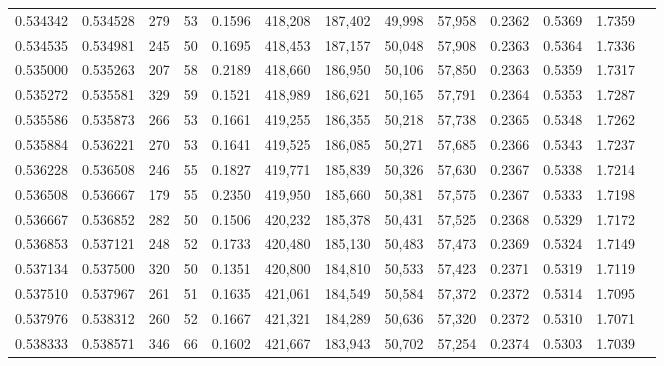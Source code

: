 \begin{tabular}{rrrrrrrrrrrrr}
0.534342 & 0.534528 &    279 &    53 &                                     0.1596 & 418,208 & 187,402 &  49,998 &  57,958 & 0.2362 & 0.5369 & 1.7359 \\
0.534535 & 0.534981 &    245 &    50 &                                     0.1695 & 418,453 & 187,157 &  50,048 &  57,908 & 0.2363 & 0.5364 & 1.7336 \\
0.535000 & 0.535263 &    207 &    58 &                                     0.2189 & 418,660 & 186,950 &  50,106 &  57,850 & 0.2363 & 0.5359 & 1.7317 \\
0.535272 & 0.535581 &    329 &    59 &                                     0.1521 & 418,989 & 186,621 &  50,165 &  57,791 & 0.2364 & 0.5353 & 1.7287 \\
0.535586 & 0.535873 &    266 &    53 &                                     0.1661 & 419,255 & 186,355 &  50,218 &  57,738 & 0.2365 & 0.5348 & 1.7262 \\
0.535884 & 0.536221 &    270 &    53 &                                     0.1641 & 419,525 & 186,085 &  50,271 &  57,685 & 0.2366 & 0.5343 & 1.7237 \\
0.536228 & 0.536508 &    246 &    55 &                                     0.1827 & 419,771 & 185,839 &  50,326 &  57,630 & 0.2367 & 0.5338 & 1.7214 \\
0.536508 & 0.536667 &    179 &    55 &                                     0.2350 & 419,950 & 185,660 &  50,381 &  57,575 & 0.2367 & 0.5333 & 1.7198 \\
0.536667 & 0.536852 &    282 &    50 &                                     0.1506 & 420,232 & 185,378 &  50,431 &  57,525 & 0.2368 & 0.5329 & 1.7172 \\
0.536853 & 0.537121 &    248 &    52 &                                     0.1733 & 420,480 & 185,130 &  50,483 &  57,473 & 0.2369 & 0.5324 & 1.7149 \\
0.537134 & 0.537500 &    320 &    50 &                                     0.1351 & 420,800 & 184,810 &  50,533 &  57,423 & 0.2371 & 0.5319 & 1.7119 \\
0.537510 & 0.537967 &    261 &    51 &                                     0.1635 & 421,061 & 184,549 &  50,584 &  57,372 & 0.2372 & 0.5314 & 1.7095 \\
0.537976 & 0.538312 &    260 &    52 &                                     0.1667 & 421,321 & 184,289 &  50,636 &  57,320 & 0.2372 & 0.5310 & 1.7071 \\
0.538333 & 0.538571 &    346 &    66 &                                     0.1602 & 421,667 & 183,943 &  50,702 &  57,254 & 0.2374 & 0.5303 & 1.7039 \\

\end{tabular}
